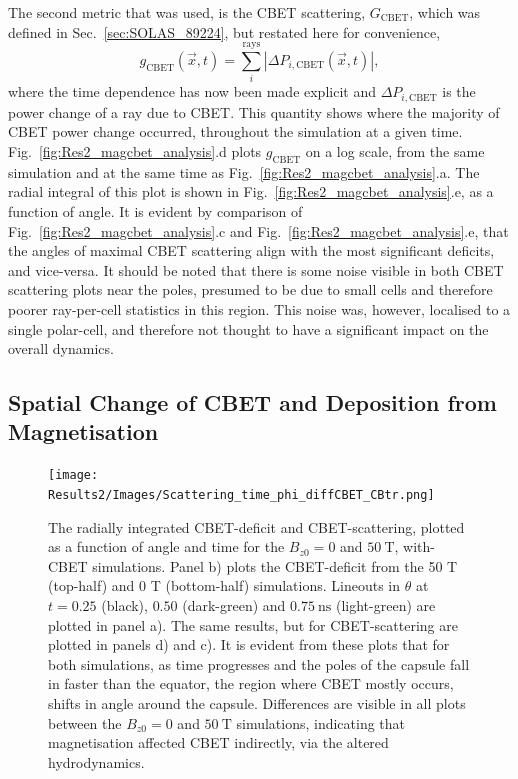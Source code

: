 The second metric that was used, is the \ac{CBET} scattering, $G_{\text{CBET}}$, which was defined in Sec.~\ref{sec:SOLAS_89224}, but restated here for convenience,
\begin{equation}
    \label{sec:res1_cbet_scattering}
    g_{\text{CBET}}(\vec{x},t) = \sum_{i}^{\text{rays}} \left| \Delta P_{i,\text{CBET}}(\vec{x},t) \right|,
\end{equation}
where the time dependence has now been made explicit and $\Delta P_{i,\text{CBET}}$ is the power change of a ray due to \ac{CBET}.
This quantity shows where the majority of \ac{CBET} power change occurred, throughout the simulation at a given time.
Fig.~\ref{fig:Res2_magcbet_analysis}.d plots $g_{\text{CBET}}$ on a log scale, from the same simulation and at the same time as Fig.~\ref{fig:Res2_magcbet_analysis}.a.
The radial integral of this plot is shown in Fig.~\ref{fig:Res2_magcbet_analysis}.e, as a function of angle.
It is evident by comparison of Fig.~\ref{fig:Res2_magcbet_analysis}.c and Fig.~\ref{fig:Res2_magcbet_analysis}.e, that the angles of maximal \ac{CBET} scattering align with the most significant deficits, and vice-versa.
It should be noted that there is some noise visible in both \ac{CBET} scattering plots near the poles, presumed to be due to small cells and therefore poorer ray-per-cell statistics in this region.
This noise was, however, localised to a single polar-cell, and therefore not thought to have a significant impact on the overall dynamics.

\subsection{Spatial Change of CBET and Deposition from Magnetisation}%
\label{sec:Res2_mag_on_cbet_change}

\begin{figure}[t!]
    \texttt{[image: Results2/Images/Scattering\_time\_phi\_diffCBET\_CBtr.png]}
    \centering
    \caption{The radially integrated \ac{CBET}-deficit and \ac{CBET}-scattering, plotted as a function of angle and time for the $B_{z0}=0$ and $50\ \text{T}$, with-\ac{CBET} simulations.
    Panel b) plots the \ac{CBET}-deficit from the 50 T (top-half) and 0 T (bottom-half) simulations.
    Lineouts in $\theta$ at $t=0.25$ (black), $0.50$ (dark-green) and $0.75\ \text{ns}$ (light-green) are plotted in panel a).
    The same results, but for \ac{CBET}-scattering are plotted in panels d) and c).
    It is evident from these plots that for both simulations, as time progresses and the poles of the capsule fall in faster than the equator, the region where \ac{CBET} mostly occurs, shifts in angle around the capsule.
    Differences are visible in all plots between the $B_{z0}=0$ and $50\ \text{T}$ simulations, indicating that magnetisation affected \ac{CBET} indirectly, via the altered hydrodynamics.}%
    \label{fig:Res2_scattering}
\end{figure}

